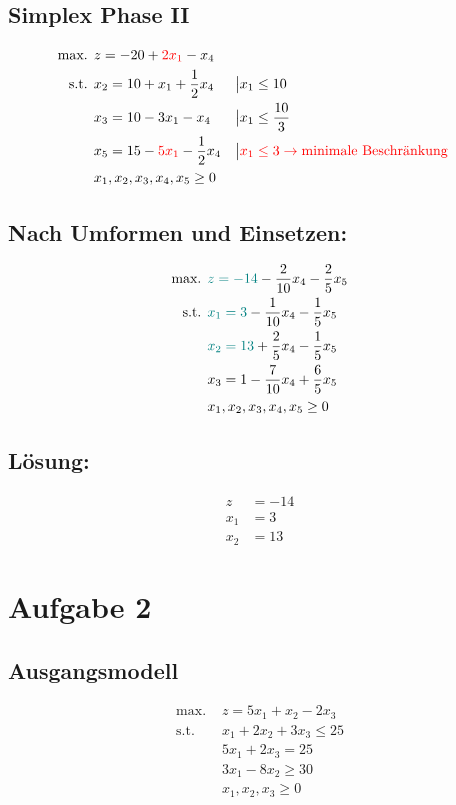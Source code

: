 \documentclass[a4paper,11pt]{article}
\begin{document}
\subsection*{Simplex Phase II}
\begin{align*}
\text{max. } & z = -20 + {\color{red} 2x_1} - x_4 \\
\text{s.t. } & x_2 = 10 + x_1 + \frac{1}{2}x_4 &&\big| x_1 \le 10 \\
& x_3 = 10 - 3x_1 - x_4 &&\big| x_1 \le \frac{10}{3} \\
& x_5 = 15 - {\color{red} 5x_1} - \frac{1}{2}x_4 &&\big| \color{red} x_1 \le 3 \to \text{minimale Beschränkung} \\
& x_1, x_2, x_3, x_4, x_5 \ge 0
\end{align*}

\subsection*{Nach Umformen und Einsetzen:}
\begin{align*}
\text{max. } & {\color{teal} z = -14} - \frac{2}{10}x_4 - \frac{2}{5}x_5 \\
\text{s.t. } & {\color{teal} x_1 = 3} - \frac{1}{10}x_4 - \frac{1}{5}x_5 \\
& {\color{teal} x_2 = 13} + \frac{2}{5}x_4 - \frac{1}{5}x_5 \\
& x_3 = 1 - \frac{7}{10}x_4 + \frac{6}{5}x_5 \\
& x_1, x_2, x_3, x_4, x_5 \ge 0
\end{align*}

\subsection*{Lösung:}
\begin{align*}
z &= -14 \\
x_1 &= 3 \\
x_2 &= 13
\end{align*}


\section*{Aufgabe 2}
\subsection*{Ausgangsmodell}
\begin{align*}
\text{max. } & z = 5x_1 + x_2 - 2x_3 \\
\text{s.t. } & x_1 + 2x_2 + 3x_3 \le 25 \\
& 5x_1 + 2x_3 = 25 \\
& 3x_1 - 8x_2 \ge 30 \\
& x_1, x_2, x_3 \ge 0
\end{align*}
\end{document}
